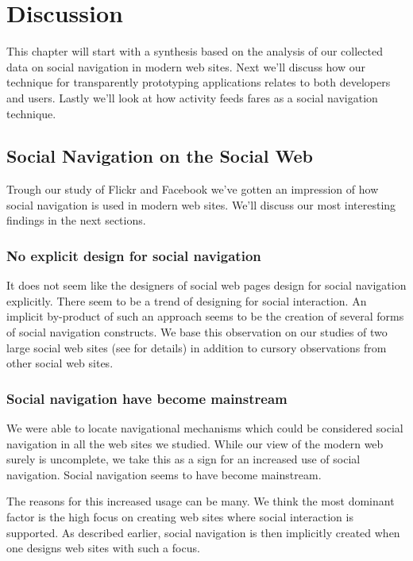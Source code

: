 \chapter{Discussion}
\label{chapter:discussion}

This chapter will start with a synthesis based on the analysis of our
collected data on social navigation in modern web sites.
Next we'll discuss how our technique for transparently prototyping
applications relates to both developers and users. Lastly we'll look at how
activity feeds fares as a social navigation technique.

\section{Social Navigation on the Social Web}

Trough our study of Flickr and Facebook we've gotten an impression of how
social navigation is used in modern web sites. We'll discuss our most
interesting findings in the next sections.

\subsection{No explicit design for social navigation}

It does not seem like the designers of social web pages design for social
navigation explicitly. There seem to be a trend of designing for social
interaction. An implicit by-product of such an approach seems to be
the creation of several forms of social navigation constructs.
We base this observation on our studies of two large social web sites
(see  for details)
in addition to cursory observations from other social web sites.

\subsection{Social navigation have become mainstream}

We were able to locate navigational mechanisms which could be considered
social navigation in all the web sites we studied. While our view of the
modern web surely is uncomplete, we take this as a sign for an increased use
of social navigation. Social navigation seems to have become mainstream.

The reasons for this increased usage can be many. We think the most dominant
factor is the high focus on creating web sites where social interaction is
supported. As described earlier, social navigation is then implicitly created
when one designs web sites with such a focus.

